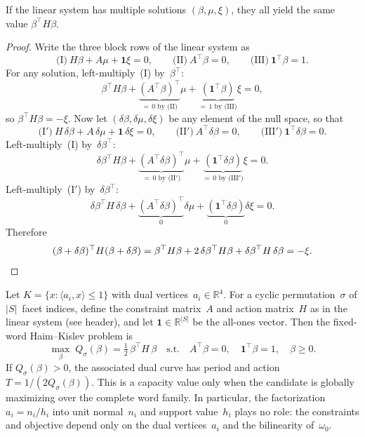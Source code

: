 \begin{notationupdated}
\begin{lemma}\label{lem:well-defined}
If the linear system has multiple solutions
$(\beta, \mu, \xi)$, they all yield the same value
$\beta^\top H \beta$.
\end{lemma}

\begin{proof}
Write the three block rows of the linear system as
\[
  \text{(I)}\ H\beta + A\mu + \mathbf{1}\xi = 0, \qquad
  \text{(II)}\ A^\top \beta = 0, \qquad
  \text{(III)}\ \mathbf{1}^\top \beta = 1.
\]
For any solution, left-multiply~(I) by~$\beta^\top$:
\[
  \beta^\top H\beta
  + \underbrace{(A^\top\beta)^\top}_{=\,0\text{ by (II)}}\mu
  + \underbrace{(\mathbf{1}^\top\beta)}_{=\,1\text{ by (III)}}\xi
  = 0,
\]
so $\beta^\top H\beta = -\xi$.
Now let $(\delta\beta, \delta\mu, \delta\xi)$ be any element
of the null space, so that
\[
  \text{(I$'$)}\ H\,\delta\beta + A\,\delta\mu + \mathbf{1}\,\delta\xi = 0, \qquad
  \text{(II$'$)}\ A^\top\delta\beta = 0, \qquad
  \text{(III$'$)}\ \mathbf{1}^\top\delta\beta = 0.
\]
Left-multiply~(I) by~$\delta\beta^\top$:
\[
  \delta\beta^\top H\beta
  + \underbrace{(A^\top\delta\beta)^\top}_{=\,0\text{ by (II$'$)}}\mu
  + \underbrace{(\mathbf{1}^\top\delta\beta)}_{=\,0\text{ by (III$'$)}}\xi
  = 0.
\]
Left-multiply~(I$'$) by~$\delta\beta^\top$:
\[
  \delta\beta^\top H\,\delta\beta
  + \underbrace{(A^\top\delta\beta)^\top}_{0}\delta\mu
  + \underbrace{(\mathbf{1}^\top\delta\beta)}_{0}\delta\xi
  = 0.
\]
Therefore
\[
  (\beta + \delta\beta)^\top H(\beta + \delta\beta)
  = \beta^\top H\beta
    + 2\,\delta\beta^\top H\beta
    + \delta\beta^\top H\,\delta\beta
  = -\xi. \qedhere
\]
\end{proof}
\end{notationupdated}


\begin{lemma}%
\label{lem:dual-vertex-qp}
Let $K = \{x : \langle a_i, x \rangle \leq 1\}$ with dual
vertices~$a_i \in \mathbb{R}^4$.
For a cyclic permutation~$\sigma$ of $|S|$~facet indices,
define the constraint matrix~$A$ and action matrix~$H$ as in the
linear system (see header), and let $\mathbf{1} \in \mathbb{R}^{|S|}$
be the all-ones vector.
Then the fixed-word Haim--Kislev problem is
\[
  \max_{\beta}\; Q_\sigma(\beta)
  =\tfrac{1}{2}\,\beta^\top H\,\beta
  \quad\text{s.t.}\quad
  A^\top \beta = 0,\quad
  \mathbf{1}^\top \beta = 1,\quad
  \beta\geq0.
\]
If \(Q_\sigma(\beta)>0\), the associated dual curve has period and
action \(T=1/(2Q_\sigma(\beta))\).  This is a capacity value only when
the candidate is globally maximizing over the complete word family.
In particular, the factorization $a_i = n_i/h_i$
into unit normal~$n_i$ and support value~$h_i$ plays no role:
the constraints and objective depend only on the dual
vertices~$a_i$ and the bilinearity of~$\omega_0$.
\end{lemma}

